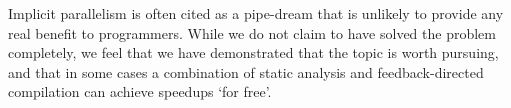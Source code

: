 Implicit parallelism is often cited as a pipe-dream that is unlikely to provide
any real benefit to programmers. While we do not claim to have solved the
problem completely, we feel that we have demonstrated that the topic is worth
pursuing, and that in some cases a combination of static analysis and
feedback-directed compilation can achieve speedups `for free'.
